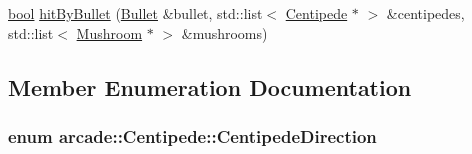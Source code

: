 \begin{DoxyCompactItemize}
\item 
\hyperlink{term__entry_8h_a002004ba5d663f149f6c38064926abac}{bool} \hyperlink{classarcade_1_1_centipede_a4331bb6a29f08b8a003dc1ee29f3ddd7}{hit\-By\-Bullet} (\hyperlink{classarcade_1_1_bullet}{Bullet} \&bullet, std\-::list$<$ \hyperlink{classarcade_1_1_centipede}{Centipede} $\ast$ $>$ \&centipedes, std\-::list$<$ \hyperlink{classarcade_1_1_mushroom}{Mushroom} $\ast$ $>$ \&mushrooms)
\end{DoxyCompactItemize}


\subsection{Member Enumeration Documentation}
\hypertarget{classarcade_1_1_centipede_a5ee9df78614426762a3960348e1bc27b}{
\subsubsection[{Centipede\-Direction}]{\setlength{\rightskip}{0pt plus 5cm}enum {\bf arcade\-::\-Centipede\-::\-Centipede\-Direction}}}\label{classarcade_1_1_centipede_a5ee9df78614426762a3960348e1bc27b}
